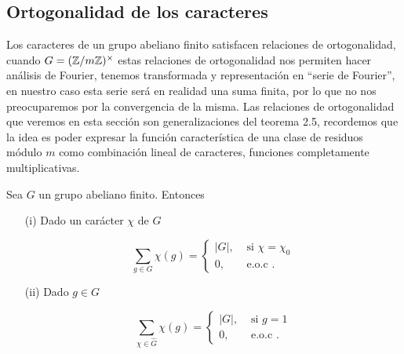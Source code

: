 \subsection{Ortogonalidad de los caracteres}

Los caracteres de un grupo abeliano finito satisfacen relaciones de ortogonalidad, cuando $G=(\mathbb{Z}/m\mathbb{Z})^{\times}$ estas relaciones de ortogonalidad nos permiten hacer análisis de Fourier, tenemos transformada y representación en ``serie de Fourier'', en nuestro caso esta serie será en realidad una suma finita, por lo que no nos preocuparemos por  la convergencia de la misma. Las relaciones de ortogonalidad que veremos en esta sección son generalizaciones del teorema 2.5, recordemos que la idea es poder expresar la función característica de una clase de residuos módulo $m$ como combinación lineal de caracteres, funciones completamente multiplicativas.

\begin{theorem}
Sea $G$ un grupo abeliano finito. Entonces

\begin{itemize}
    \item [(i)] Dado un carácter $\chi$ de $G$

$$
\sum_{g \in G} \chi(g)= \begin{cases}|G|, & \text { si } \chi=\chi_0 \\ 0, & \text { e.o.c }.\end{cases}
$$

\item[(ii)] Dado $g \in G$

$$
\sum_{\chi \in \widehat{G}} \chi(g)= \begin{cases}|G|, & \text { si } g=1 \\ 0, & \text { e.o.c }.\end{cases}
$$
\end{itemize}

\end{theorem}

